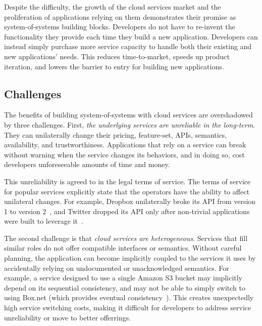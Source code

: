 Despite the difficulty, the growth of the cloud services market and the proliferation of
applications relying on them demonstrates their promise as system-of-systems
building blocks.  Developers do not have to re-invent the functionality they
provide each time they build a new application.  Developers can instead
simply purchase more service capacity to
handle both their existing and new applications' needs.
This reduces time-to-market, speeds up product iteration,
and lowers the barrier to entry for building new applications.

\subsection{Challenges}

The benefits of building system-of-systems with cloud services are overshadowed
by three challenges.  First, \emph{the underlying services
are unreliable in the long-term}.  They can unilaterally
change their pricing, feature-set, APIs, semantics, availability, and
trustworthiness.  Applications that rely on a service can break without warning
when the service changes its behaviors, and in doing so,
cost developers unforeseeable amounts of time and money.

This unreliability is agreed to in the legal terms of service.  The terms of
service for popular services explicitly state that the operators have the ability to affect unilateral
changes.  For example, Dropbox unilaterally broke its API from version 1 to version
2~\cite{dropbox-v2-api-psa}, and Twitter dropped its API only after non-trivial
applications were built to leverage it~\cite{twitter-api-deprecation-psa}.

The second challenge is that \emph{cloud services are heterogeneous}.
Services that fill similar roles do not offer compatible interfaces or semantics.
Without careful planning, the application can become implicitly coupled to the
services it uses by accidentally relying on undocumented or unacknowledged
semantics.  For example, a service designed to use a single Amazon S3 bucket may implicitly
depend on its sequential consistency, and may not be able to simply switch to
using Box.net (which provides eventual
consistency~\cite{consistency-comparison-cloud-storage}).
This creates unexpectedly high service switching costs, making it
difficult for developers to address service unreliability or move to better
offerrings.


